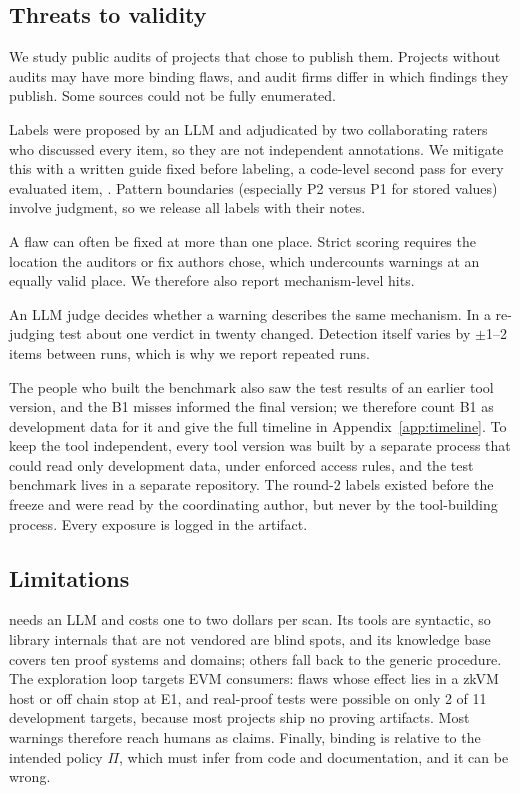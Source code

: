 \subsection{Threats to validity}\label{sec:disc-threats}

We study public audits of projects that chose to publish them. Projects
without audits may have more binding flaws, and audit firms differ in which
findings they publish. Some sources could not be fully enumerated.

Labels were proposed by an LLM and adjudicated by two collaborating raters
who discussed every item, so they are not independent annotations. We mitigate this with a
written guide fixed before labeling, a code-level second pass for every
evaluated item, . Pattern boundaries (especially P2 versus P1 for stored
values) involve judgment, so we release all labels with their notes.

A flaw can often be fixed at more than one place. Strict scoring requires the
location the auditors or fix authors chose, which undercounts warnings at an
equally valid place. We therefore also report mechanism-level hits.

An LLM judge decides whether a warning describes the same mechanism. In a
re-judging test about one verdict in twenty changed. Detection itself varies
by $\pm$1--2 items between runs, which is why we report repeated runs.

The people who built the benchmark also saw the test results of an earlier
tool version, and the B1 misses informed the final version; we therefore
count B1 as development data for it and give the full timeline in
Appendix~\ref{app:timeline}. To keep the tool independent, every tool version was built by a
separate process that could read only development data, under enforced access
rules, and the test benchmark lives in a separate repository. The round-2
labels existed before the freeze and were read by the coordinating author, but
never by the tool-building process. Every exposure is logged in the
artifact.

\subsection{Limitations}\label{sec:disc-limits}

\tool{} needs an LLM and costs one to two dollars per scan. Its tools are
syntactic, so library internals that are not vendored are blind spots, and
its knowledge base covers ten proof systems and domains; others fall back to
the generic procedure. The exploration loop targets EVM consumers: flaws
whose effect lies in a zkVM host or off chain stop at E1, and real-proof
tests were possible on only 2 of 11 development targets, because most
projects ship no proving artifacts. Most warnings therefore reach humans as
claims. Finally, binding is relative to the intended policy $\Pi$, which
\tool{} must infer from code and documentation, and it can be wrong.
